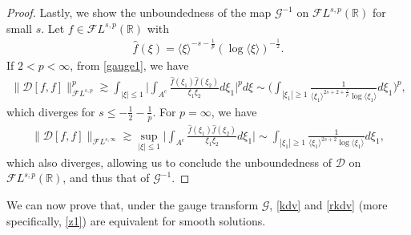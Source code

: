\documentclass[%
11pt,  reqno]{amsart}
\makeatletter
\newcommand{\jap}[1]{\langle #1 \rangle}
\newcommand{\5}{\textup{V}}
\newcommand{\FL}{\mathcal{F} L}
\newcommand{\ft}{\widehat}
\newcommand{\les}{\lesssim}
\theoremstyle{remark}
\newcommand{\R}{\mathbb{R}}
\newcommand{\ges}{\gtrsim}
\newcommand{\jb}[1]
{\langle #1 \rangle}
\def\<#1>{\csname MH@symb@#1\endcsname}
\newcommand{\cherryS}{
	\resizebox{!}{1.3ex}{%
		\<1>%
	}
}
\newcommand{\Gc}{\mathcal{G}}
\numberwithin{equation}{section}
\numberwithin{theorem}{section}
\newcommand{\DD}{\mathcal{D}}
\makeatother
\begin{document}
\begin{proof}


\smallskip 

Lastly, we show the unboundedness of the map $\Gc^{-1}$ on $\FL^{s,p}(\R)$ for small $s$. Let $f \in \FL^{s, p}(\R)$ with 
\begin{align}
    \ft{f}(\xi) = \jb{\xi}^{-s-\frac1p}(\log \jap{\xi})^{-\frac12}. 
\end{align}
If $2 <p <\infty$, from \eqref{gauge1}, we have
\begin{align}
\| \DD[f,f] \|_{\FL^{s,p}}^p 
\ges 
\int_{|\xi|\le 1} \bigg| \int_{A^c} \frac{\ft{f}(\xi_1) \ft{f}(\xi_2) }{\xi_1\xi_2} d\xi_1 \bigg|^p d\xi
\sim \bigg( \int_{|\xi_1| \ge 1} \frac{1}{\jb{\xi_1}^{2s+2 + \frac2p  }\log\jap{\xi_1}} d\xi_1\bigg)^p , 
\end{align}
which diverges for $s\le-\frac12 - \frac1p$. For $p=\infty$, we have
\begin{align}
\| \DD[f,f]\|_{\FL^{s,\infty }}
\ges 
\sup_{|\xi| \le 1} 
\bigg| \int_{A^c} \frac{\ft{f}(\xi_1) \ft{f}(\xi_2) }{\xi_1\xi_2} d\xi_1 \bigg|
\sim 
\int_{|\xi_1| \ge 1 } \frac{1}{\jb{\xi_1}^{2s+2}\log\jap{\xi_1}} d\xi_1  ,
\end{align}
which also diverges, allowing us to conclude the unboundedness of $\DD$ on $\FL^{s, p}(\R)$, and thus that of $\Gc^{-1}$. 
\qedhere 

\end{proof}

We can now prove that, under the gauge transform $\Gc$, \eqref{kdv} and \eqref{rkdv} (more specifically, \eqref{z1}) are equivalent for smooth solutions.
\end{document}
